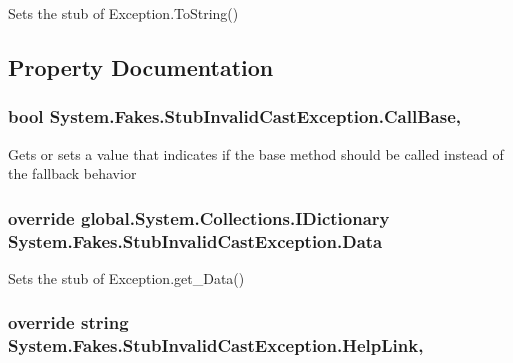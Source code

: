 Sets the stub of Exception.\-To\-String()



\subsection{Property Documentation}
\hypertarget{class_system_1_1_fakes_1_1_stub_invalid_cast_exception_a8e3620b2660404ddd73dc12ae596b33a}{
\subsubsection[{Call\-Base}]{\setlength{\rightskip}{0pt plus 5cm}bool System.\-Fakes.\-Stub\-Invalid\-Cast\-Exception.\-Call\-Base\hspace{0.3cm}{\ttfamily [get]}, {\ttfamily [set]}}}\label{class_system_1_1_fakes_1_1_stub_invalid_cast_exception_a8e3620b2660404ddd73dc12ae596b33a}


Gets or sets a value that indicates if the base method should be called instead of the fallback behavior

\hypertarget{class_system_1_1_fakes_1_1_stub_invalid_cast_exception_a3fd3dda3b8d06dafb2cabc4dc7ab2b1b}{
\subsubsection[{Data}]{\setlength{\rightskip}{0pt plus 5cm}override global.\-System.\-Collections.\-I\-Dictionary System.\-Fakes.\-Stub\-Invalid\-Cast\-Exception.\-Data\hspace{0.3cm}{\ttfamily [get]}}}\label{class_system_1_1_fakes_1_1_stub_invalid_cast_exception_a3fd3dda3b8d06dafb2cabc4dc7ab2b1b}


Sets the stub of Exception.\-get\-\_\-\-Data()

\hypertarget{class_system_1_1_fakes_1_1_stub_invalid_cast_exception_abc777d459af519defe99b0e3ed25032b}{
\subsubsection[{Help\-Link}]{\setlength{\rightskip}{0pt plus 5cm}override string System.\-Fakes.\-Stub\-Invalid\-Cast\-Exception.\-Help\-Link\hspace{0.3cm}{\ttfamily [get]}, {\ttfamily [set]}}}\label{class_system_1_1_fakes_1_1_stub_invalid_cast_exception_abc777d459af519defe99b0e3ed25032b}



